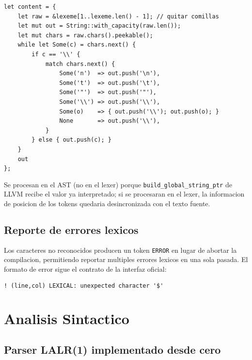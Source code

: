 \documentclass[12pt,a4paper]{article}
\begin{document}
\begin{lstlisting}[style=rust, caption={Procesamiento de escapes en semantic\_actions.rs}]
let content = {
    let raw = &lexeme[1..lexeme.len() - 1]; // quitar comillas
    let mut out = String::with_capacity(raw.len());
    let mut chars = raw.chars().peekable();
    while let Some(c) = chars.next() {
        if c == '\\' {
            match chars.next() {
                Some('n')  => out.push('\n'),
                Some('t')  => out.push('\t'),
                Some('"')  => out.push('"'),
                Some('\\') => out.push('\\'),
                Some(o)    => { out.push('\\'); out.push(o); }
                None       => out.push('\\'),
            }
        } else { out.push(c); }
    }
    out
};
\end{lstlisting}

Se procesan en el AST (no en el lexer) porque \texttt{build\_global\_string\_ptr} de LLVM
recibe el valor ya interpretado; si se procesaran en el lexer, la informacion de posicion
de los tokens quedaria desincronizada con el texto fuente.

\subsection{Reporte de errores lexicos}

Los caracteres no reconocidos producen un token \texttt{ERROR} en lugar de abortar la
compilacion, permitiendo reportar multiples errores lexicos en una sola pasada. El formato
de error sigue el contrato de la interfaz oficial:

\begin{verbatim}
! (line,col) LEXICAL: unexpected character '$'
\end{verbatim}

\section{Analisis Sintactico}

\subsection{Parser LALR(1) implementado desde cero}
\end{document}
